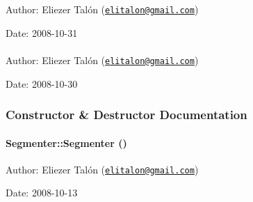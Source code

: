\begin{Desc}
\item[Author:]Eliezer Talón (\href{mailto:elitalon@gmail.com}{\tt elitalon@gmail.com}) \end{Desc}
\begin{Desc}
\item[Date:]2008-10-31 \end{Desc}
\hypertarget{class_segmenter_1190be7ec081a96ee2ae91e0bb256a0d}{
\paragraph[{ShapeIterator}]{}\hfill}
\label{class_segmenter_1190be7ec081a96ee2ae91e0bb256a0d}


\begin{Desc}
\item[Author:]Eliezer Talón (\href{mailto:elitalon@gmail.com}{\tt elitalon@gmail.com}) \end{Desc}
\begin{Desc}
\item[Date:]2008-10-30 \end{Desc}


\subsubsection{Constructor \& Destructor Documentation}
\hypertarget{class_segmenter_d39ec3bda31be180820aa0bdca7b125d}{
\paragraph[{Segmenter}]{\setlength{\rightskip}{0pt plus 5cm}Segmenter::Segmenter ()}\hfill}
\label{class_segmenter_d39ec3bda31be180820aa0bdca7b125d}


\begin{Desc}
\item[Author:]Eliezer Talón (\href{mailto:elitalon@gmail.com}{\tt elitalon@gmail.com}) \end{Desc}
\begin{Desc}
\item[Date:]2008-10-13 \end{Desc}



